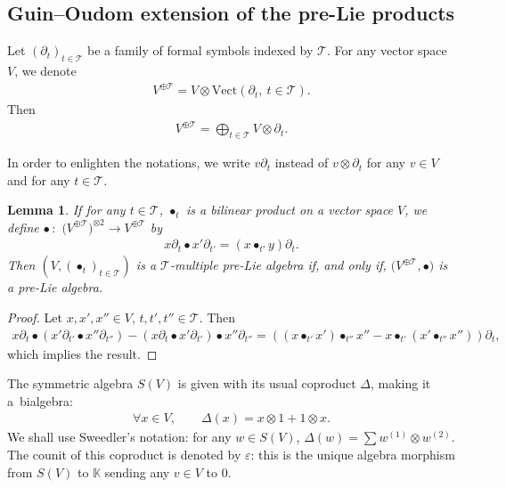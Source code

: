 \documentclass[pdftex]{sigma}
\numberwithin{equation}{section}
\newtheorem{Lemma}[Theorem]{Lemma}
\newcommand{\K}{\mathbb{K}}
\newcommand{\T}{\mathcal{T}}
\begin{document}
\subsection{Guin--Oudom extension of the pre-Lie products}

{\samepage\begin{Notation}
Let $(\partial_t)_{t\in \T}$ be a family of formal symbols indexed by $\T$. For any vector space~$V$, we denote
\begin{gather*}
V^{\oplus \T}=V\otimes \mathrm{Vect}(\partial_t,\:t\in \T).
\end{gather*}
Then
\begin{gather*}
V^{\oplus \T}=\bigoplus_{t\in \T} V\otimes \partial_t.
\end{gather*}
\end{Notation}
In order to enlighten the notations, we write $v\partial_t$ instead of $v\otimes \partial_t$
for any $v\in V$ and for any $t\in \T$.

}

\begin{Lemma}
If for any $t\in \T$, $\bullet_t$ is a bilinear product on a vector space $V$,
we define $\bullet\,{:}$ $\big(V^{\oplus \T}\big)^{\otimes 2}\longrightarrow V^{\oplus \T}$ by
\begin{gather*}
x\partial_t \bullet x'\partial_{t'}=(x\bullet_{t'} y)\partial_t.
\end{gather*}
Then $(V,(\bullet_t)_{t\in \T})$ is a $\T$-multiple pre-Lie algebra if,
and only if, $\big(V^{\oplus \T},\bullet\big)$ is a pre-Lie algebra.
\end{Lemma}

\begin{proof}
Let $x,x',x''\in V$, $t,t',t''\in \T$. Then
\begin{gather*}
x\partial_t\bullet (x'\partial_{t'}\bullet x''\partial_{t''})-(x\partial_t\bullet x'\partial_{t'})\bullet x''\partial_{t''}
=\left((x\bullet_{t'} x')\bullet_{t''} x''-x\bullet_{t'}(x'\bullet_{t''}x'')\right)\partial_t,
\end{gather*}
which implies the result.
\end{proof}

\begin{Notation}
The symmetric algebra $S(V)$ is given with its usual coproduct $\Delta$, making it a~bialgebra:
\begin{gather*}
\forall x\in V,\qquad \Delta(x)=x\otimes 1+1\otimes x.
\end{gather*}
We shall use Sweedler's notation: for any $w\in S(V)$, $\Delta(w)=\sum w^{(1)}\otimes w^{(2)}$.
The counit of this coproduct is denoted by $\varepsilon$: this is the unique algebra morphism from $S(V)$ to $\K$ sending any $v\in V$ to $0$.
\end{Notation}
\end{document}
